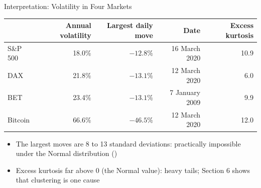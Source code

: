 \begin{frame}{Interpretation: Volatility in Four Markets}
\itemsize{\footnotesize}
\begin{center}
\footnotesize
\begin{tabular}{lrrrr}
\toprule
& \textbf{Annual volatility} & \textbf{Largest daily move} & \textbf{Date} & \textbf{Excess kurtosis} \\
\midrule
S\&P 500 & 18.0\% & ${-12.8}\%$ & 16 March 2020 & 10.9 \\
DAX & 21.8\% & ${-13.1}\%$ & 12 March 2020 & 6.0 \\
BET & 23.4\% & ${-13.1}\%$ & 7 January 2009 & 9.9 \\
Bitcoin & 66.6\% & ${-46.5}\%$ & 12 March 2020 & 12.0 \\
\bottomrule
\end{tabular}
\end{center}
\begin{itemize}
    \item The largest moves are 8 to 13 standard deviations: practically impossible under the Normal distribution ()
    \item Excess kurtosis far above 0 (the Normal value): heavy tails; Section 6 shows that clustering is one cause
\end{itemize}
\end{frame}

